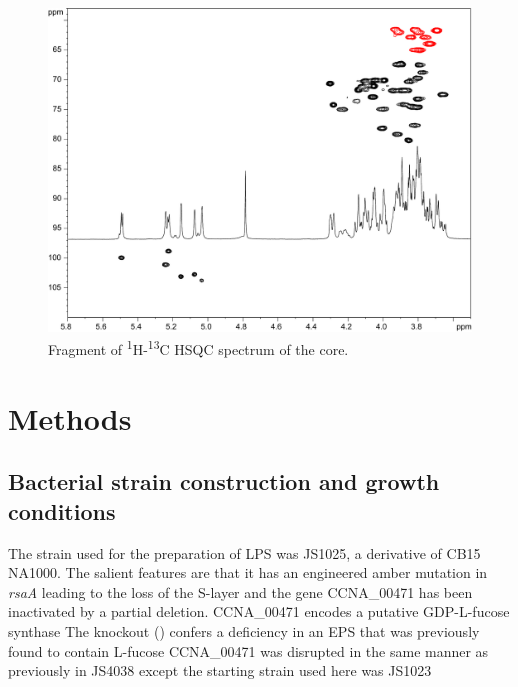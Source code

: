 		\begin{figure}[htb]
			\begin{center}
				\includegraphics[width=\textwidth]{lps_chapter/img/lpsfig4.pdf}
			\end{center}
			\caption{Fragment of \textsuperscript{1}H-\textsuperscript{13}C \ac{HSQC} spectrum of the core.}
			\label{fig:lpscorenmr}	
		\end{figure}

\section{Methods} %
\label{sec:methods}

	\subsection{Bacterial strain construction and growth conditions} %
	\label{sub:bacterial_strain_construction_and_growth_conditions}

		The strain used for the preparation of \ac{LPS} was JS1025, a derivative of \caulobacter CB15 NA1000. The salient features are that it has an engineered amber mutation in \textit{rsaA} leading to the loss of the \ac{S-layer} and the gene CCNA\_00471 has been inactivated by a partial deletion. CCNA\_00471 encodes a putative GDP-L-fucose synthase The knockout () confers a deficiency in an \ac{EPS} that was previously found to contain L-fucose CCNA\_00471 was disrupted in the same manner as previously in JS4038 except the starting strain used here was JS1023 
		
